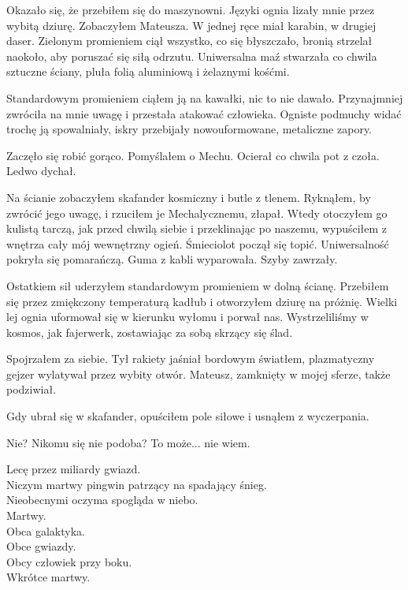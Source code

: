 Okazało się, że przebiłem się do maszynowni.
Języki ognia lizały mnie przez wybitą dziurę.
Zobaczyłem Mateusza. 
W jednej ręce miał karabin, w drugiej daser.
Zielonym promieniem ciął wszystko, co się błyszczało, bronią strzelał naokoło, aby poruszać się siłą odrzutu.
Uniwersalna maź stwarzała co chwila sztuczne ściany, pluła folią aluminiową i żelaznymi kośćmi. 

Standardowym promieniem ciąłem ją na kawałki, nic to nie dawało.
Przynajmniej zwróciła na mnie uwagę i przestała atakować człowieka.
Ogniste podmuchy widać trochę ją spowalniały, iskry przebijały nowouformowane, metaliczne zapory.

Zaczęło się robić gorąco. Pomyślałem o Mechu. 
Ocierał co chwila pot z czoła.
Ledwo dychał.

Na ścianie zobaczyłem skafander kosmiczny i butle z tlenem.
Ryknąłem, by zwrócić jego uwagę, i rzuciłem je Mechalycznemu, złapał.
Wtedy otoczyłem go kulistą tarczą, jak przed chwilą siebie i przeklinając po naszemu, wypuściłem z wnętrza cały mój wewnętrzny ogień.
Śmieciolot począł się topić.
Uniwersalność pokryła się pomarańczą. 
Guma z kabli wyparowała. 
Szyby zawrzały.

Ostatkiem sił uderzyłem standardowym promieniem w dolną ścianę.
Przebiłem się przez zmiękczony temperaturą kadłub i otworzyłem dziurę na próżnię.
Wielki lej ognia uformował się w kierunku wyłomu i porwał nas.
Wystrzeliliśmy w kosmos, jak fajerwerk, zostawiając za sobą skrzący się ślad.

Spojrzałem za siebie. Tył rakiety jaśniał bordowym światłem, plazmatyczny gejzer wylatywał przez wybity otwór.
Mateusz, zamknięty w mojej sferze, także podziwiał.

Gdy ubrał się w skafander, opuściłem pole siłowe i usnąłem z wyczerpania.

\divider{}

Nie?
Nikomu się nie podoba?
To może... nie wiem.

\divider{}

\noindent
Lecę przez miliardy gwiazd. \\
Niczym martwy pingwin patrzący na spadający śnieg. \\
Nieobecnymi oczyma spogląda w niebo. \\
Martwy. \\

\noindent
Obca galaktyka. \\
Obce gwiazdy. \\
Obcy człowiek przy boku. \\
Wkrótce martwy. \\

